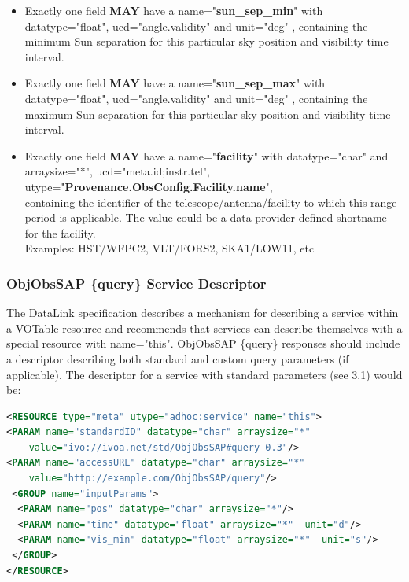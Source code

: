 \documentclass[11pt,a4paper]{ivoatex/ivoa}
\begin{document}
\begin{itemize}
\item {Exactly one field \textbf{MAY }have a name="\textbf{sun\_sep\_min}" with\\
datatype="float", ucd="angle.validity" and
unit="deg" , containing the minimum Sun separation for this particular
sky position and visibility time interval.}

\item {Exactly one field \textbf{MAY }have a name="\textbf{sun\_sep\_max}" with\\
datatype="float", ucd="angle.validity" and
unit="deg" , containing the maximum Sun separation for this particular
sky position and visibility time interval.}

\item {Exactly one field \textbf{MAY} have a name="\textbf{facility}" 
with datatype="char" and arraysize="*", ucd="meta.id;instr.tel",\\
utype="\textbf{Provenance.ObsConfig.Facility.name}",\\ 
containing the identifier of the telescope/antenna/facility to which
this range period is applicable. The value could be a data provider
defined shortname for the facility. \\
Examples: HST/WFPC2, VLT/FORS2, SKA1/LOW11, etc}
\end{itemize}

\subsubsection{ObjObsSAP \{query\} Service Descriptor}
The DataLink specification describes a mechanism for describing a
service within a VOTable resource and recommends that services can
describe themselves with a special resource with name="this". ObjObsSAP
\{query\} responses should include a descriptor describing both standard
and custom query parameters (if applicable). The descriptor for a
service with standard parameters (see 3.1) would be:\\

\begin{lstlisting}[language=XML]
<RESOURCE type="meta" utype="adhoc:service" name="this">
<PARAM name="standardID" datatype="char" arraysize="*"
    value="ivo://ivoa.net/std/ObjObsSAP#query-0.3"/>
<PARAM name="accessURL" datatype="char" arraysize="*"
    value="http://example.com/ObjObsSAP/query"/>
 <GROUP name="inputParams">
  <PARAM name="pos" datatype="char" arraysize="*"/>
  <PARAM name="time" datatype="float" arraysize="*"	 unit="d"/>
  <PARAM name="vis_min" datatype="float" arraysize="*"	unit="s"/>
 </GROUP>
</RESOURCE>
\end{lstlisting}
\end{document}

